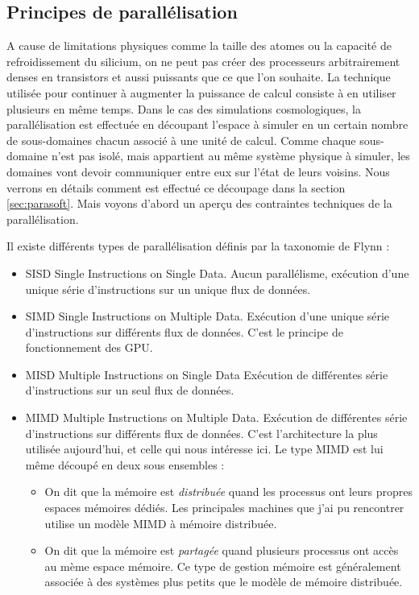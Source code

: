 \subsection{Principes de parallélisation}

A cause de limitations physiques comme la taille des atomes ou la capacité de refroidissement du silicium, on ne peut pas créer des processeurs arbitrairement denses en transistors et aussi puissants que ce que l'on souhaite.
La technique utilisée pour continuer à augmenter la puissance de calcul consiste à en utiliser plusieurs en même temps.
Dans le cas des simulations cosmologiques, la parallélisation est effectuée en découpant l'espace à simuler en un certain nombre de sous-domaines chacun associé à une unité de calcul.
Comme chaque sous-domaine n'est pas isolé, mais appartient au même système physique à simuler, les domaines vont devoir communiquer entre eux sur l'état de leurs voisins.
Nous verrons en détails comment est effectué ce découpage dans la section \ref{sec:parasoft}.
Mais voyons d'abord un aperçu des contraintes techniques de la parallélisation.

Il existe différents types de parallélisation définis par la taxonomie de Flynn \citep{Flynn:1972:COE:1952456.1952459}: 

\begin{itemize}
\item SISD Single Instructions on Single Data.
Aucun parallélisme, exécution d'une unique série d'instructions sur un unique flux de données.

\item SIMD Single Instructions on Multiple Data.
Exécution d'une unique série d'instructions sur différents flux de données.
C'est le principe de fonctionnement des GPU.

\item MISD Multiple Instructions on Single Data 
Exécution de différentes série d'instructions sur un seul flux de données.

\item MIMD Multiple Instructions on Multiple Data.
Exécution de différentes série d'instructions sur différents flux de données.
C'est l’architecture la plus utilisée aujourd'hui, et celle qui nous intéresse ici.
Le type MIMD est lui même découpé en deux sous ensembles : 

\begin{itemize}
\item On dit que la mémoire est \textit{distribuée} quand les processus ont leurs propres espaces mémoires dédiés.
Les principales machines que j'ai pu rencontrer utilise un modèle MIMD à mémoire distribuée.

\item On dit que la mémoire est \textit{partagée} quand plusieurs processus ont accès au mème espace mémoire.
Ce type de gestion mémoire est généralement associée à des systèmes plus petits que le modèle de mémoire distribuée.
\end{itemize}
\end{itemize}


